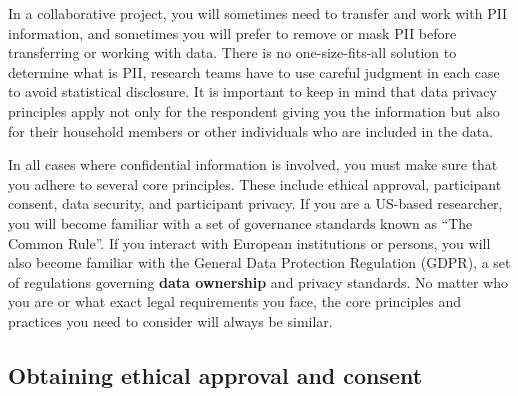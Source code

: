 In a collaborative project,
you will sometimes need to transfer and work with PII information,
and sometimes you will prefer to remove or mask PII
before transferring or working with data.
There is no one-size-fits-all solution to determine what is PII,
research teams have to use careful judgment in each case to avoid statistical disclosure.
It is important to keep in mind that data privacy principles apply
not only for the respondent giving you the information
but also for their household members or other individuals who are included in the data.

In all cases where confidential information is involved,
you must make sure that you adhere to several core principles.
These include ethical approval, participant consent,
data security, and participant privacy.
If you are a US-based researcher, you will become familiar
with a set of governance standards known as ``The Common Rule''.
If you interact with European institutions or persons,
you will also become familiar with the General Data Protection Regulation (GDPR),
a set of regulations governing \textbf{data ownership} and privacy standards.
No matter who you are or what exact legal requirements you face,
the core principles and practices you need to consider will always be similar.

\subsection{Obtaining ethical approval and consent}

